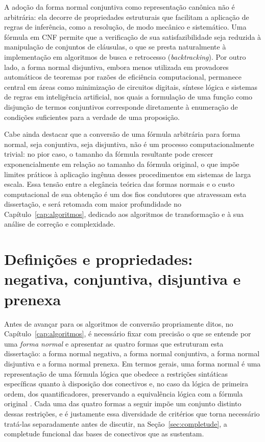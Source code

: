 \documentclass[12pt,a4paper,oneside]{report}
\theoremstyle{tituloplain}
\theoremstyle{titulodef}
\begin{document}
A adoção da forma normal conjuntiva como representação canônica não é arbitrária: ela decorre de propriedades estruturais que facilitam a aplicação de regras de inferência, como a resolução, de modo mecânico e sistemático. Uma fórmula em CNF permite que a verificação de sua satisfazibilidade seja reduzida à manipulação de conjuntos de cláusulas, o que se presta naturalmente à implementação em algoritmos de busca e retrocesso (\textit{backtracking}). Por outro lado, a forma normal disjuntiva, embora menos utilizada em provadores automáticos de teoremas por razões de eficiência computacional, permanece central em áreas como minimização de circuitos digitais, síntese lógica e sistemas de regras em inteligência artificial, nos quais a formulação de uma função como disjunção de termos conjuntivos corresponde diretamente à enumeração de condições suficientes para a verdade de uma proposição.

Cabe ainda destacar que a conversão de uma fórmula arbitrária para forma normal, seja conjuntiva, seja disjuntiva, não é um processo computacionalmente trivial: no pior caso, o tamanho da fórmula resultante pode crescer exponencialmente em relação ao tamanho da fórmula original, o que impõe limites práticos à aplicação ingênua desses procedimentos em sistemas de larga escala. Essa tensão entre a elegância teórica das formas normais e o custo computacional de sua obtenção é um dos fios condutores que atravessam esta dissertação, e será retomada com maior profundidade no Capítulo~\ref{cap:algoritmos}, dedicado aos algoritmos de transformação e à sua análise de correção e complexidade.

\section{Definições e propriedades: negativa, conjuntiva, disjuntiva e prenexa}\label{sec:definicoes}

Antes de avançar para os algoritmos de conversão propriamente ditos, no Capítulo~\ref{cap:algoritmos}, é necessário fixar com precisão o que se entende por uma \textit{forma normal} e apresentar as quatro formas que estruturam esta dissertação: a forma normal negativa, a forma normal conjuntiva, a forma normal disjuntiva e a forma normal prenexa. Em termos gerais, uma forma normal é uma representação de uma fórmula lógica que obedece a restrições sintáticas específicas quanto à disposição dos conectivos e, no caso da lógica de primeira ordem, dos quantificadores, preservando a equivalência lógica com a fórmula original \cite{walicki2011}. Cada uma das quatro formas a seguir impõe um conjunto distinto dessas restrições, e é justamente essa diversidade de critérios que torna necessário tratá-las separadamente antes de discutir, na Seção~\ref{sec:completude}, a completude funcional das bases de conectivos que as sustentam.
\end{document}
